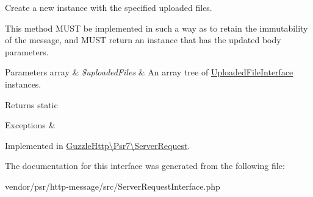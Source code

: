 Create a new instance with the specified uploaded files.

This method M\+U\+ST be implemented in such a way as to retain the immutability of the message, and M\+U\+ST return an instance that has the updated body parameters.


\begin{DoxyParams}[1]{Parameters}
array & {\em \$uploaded\+Files} & An array tree of \hyperlink{interfacePsr_1_1Http_1_1Message_1_1UploadedFileInterface}{Uploaded\+File\+Interface} instances. \\
\hline
\end{DoxyParams}
\begin{DoxyReturn}{Returns}
static 
\end{DoxyReturn}

\begin{DoxyExceptions}{Exceptions}
{\em } & \\
\hline
\end{DoxyExceptions}


Implemented in \hyperlink{classGuzzleHttp_1_1Psr7_1_1ServerRequest_ab2b182e14a422594ddc00c74c6de5f25}{Guzzle\+Http\textbackslash{}\+Psr7\textbackslash{}\+Server\+Request}.



The documentation for this interface was generated from the following file\+:\begin{DoxyCompactItemize}
\item 
vendor/psr/http-\/message/src/Server\+Request\+Interface.\+php\end{DoxyCompactItemize}
